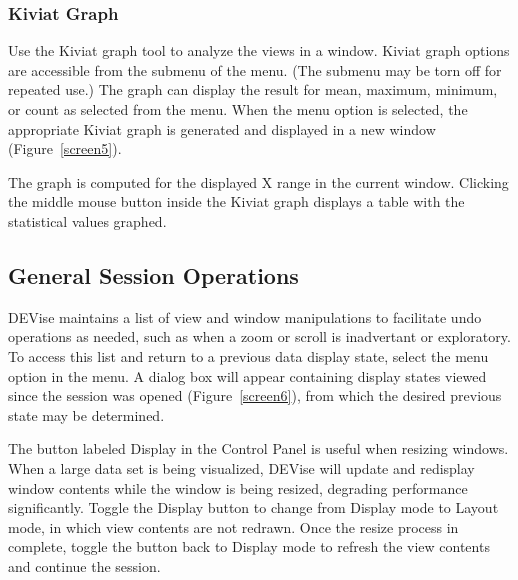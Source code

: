 
\subsubsection{Kiviat Graph}
	
Use the Kiviat graph tool to analyze the views in a window. Kiviat graph options
are accessible from the  submenu of the  menu.
(The submenu may be torn off for repeated use.) The graph can display the result
for mean, maximum, minimum, or count as selected from the menu. When the
 menu option is selected, the appropriate Kiviat graph is generated
and displayed in a new window (Figure~\ref{screen5}).

The graph is computed for the displayed X range in the current window. Clicking
the middle mouse button inside the Kiviat graph displays a table with the
statistical values graphed.



\subsection{General Session Operations}

DEVise maintains a list of view and window manipulations to facilitate undo
operations as needed, such as when a zoom or scroll is inadvertant or
exploratory. To access this list and return to a previous data display state,
select the  menu option in the  menu. A dialog box will
appear containing display states viewed since the session was opened
(Figure~\ref{screen6}), from which the desired previous state may be determined.


The button labeled Display in the Control Panel is useful when resizing windows.
When a large data set is being visualized, DEVise will update and redisplay
window contents while the window is being resized, degrading performance
significantly. Toggle the Display button to change from Display mode to Layout
mode, in which view contents are not redrawn. Once the resize process in
complete, toggle the button back to Display mode to refresh the view contents
and continue the session.


